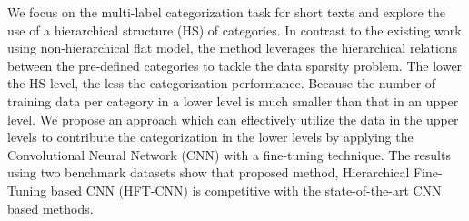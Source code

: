 We focus on the multi-label categorization task for short texts and explore the use of a hierarchical structure (HS) of categories. In contrast to the existing work using non-hierarchical flat model, the method leverages the hierarchical relations between the pre-defined categories to tackle the data sparsity problem. The lower the HS level, the less the categorization performance. Because the number of training data per category in a lower level is much smaller than that in an upper level. We propose an approach which can effectively utilize the data in the upper levels to contribute the categorization in the lower levels by applying the Convolutional Neural Network (CNN) with a fine-tuning technique. The results using two benchmark datasets show that proposed method, Hierarchical Fine-Tuning based CNN (HFT-CNN) is competitive with the state-of-the-art CNN based methods.
